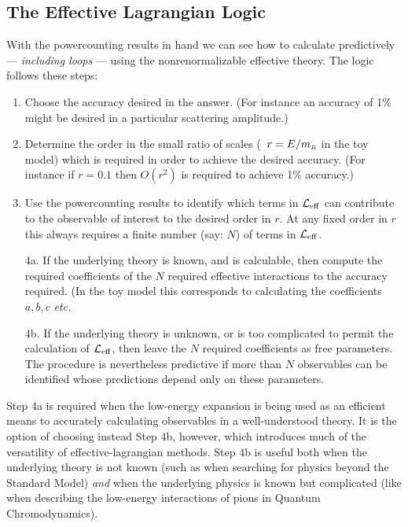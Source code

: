 \subsection{The Effective Lagrangian Logic}

With the powercounting results in hand we can see how
to calculate predictively --- {\it including loops} --- using 
the nonrenormalizable effective theory. The logic follows
these steps:

\begin{enumerate}
\item %
Choose the accuracy desired in the answer. (For instance
an accuracy of 1\% might be desired in a particular scattering
amplitude.)
%
\item %
Determine the order in the small ratio of scales (\ie\
$r = E/m_{\scriptscriptstyle R}$ in the toy model) which
is required in order to achieve the desired accuracy. (For
instance if $r = 0.1$ then $O(r^2)$ is required to achieve
1\% accuracy.)
%
\item %
Use the powercounting results to identify which terms in
${\cal L}_{\rm eff}$ can contribute to the observable
of interest to the desired order in $r$. At any fixed order
in $r$ this always requires a finite number (say: $N$) of terms in
${\cal L}_{\rm eff}$.
%
\item[4a.] %
If the underlying theory is known, and is calculable, then
compute the required coefficients of the $N$ required
effective interactions to the accuracy required. (In the
toy model this corresponds to calculating the coefficients
$a,b,c$ {\it etc.}
%
\item[4b.] %
If the underlying theory is unknown, or is too complicated
to permit the calculation of ${\cal L}_{\rm eff}$, then
leave the $N$ required coefficients as free parameters.
The procedure is nevertheless predictive if more than
$N$ observables can be identified whose predictions 
depend only on these parameters. 

\end{enumerate}

Step 4a is required when the low-energy expansion
is being used as an efficient means to accurately
calculating observables in a well-understood theory.
It is the option of choosing instead
Step 4b, however, which introduces much of
the versatility of effective-lagrangian methods. Step
4b is useful both when the underlying theory is not known
(such as when searching for physics beyond the 
Standard Model) {\it and} when the underlying physics
is known but complicated (like when describing the
low-energy interactions of pions in Quantum Chromodynamics).

